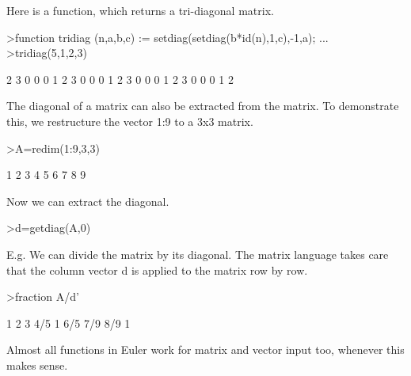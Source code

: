 \documentclass{article}
\begin{document}
\begin{eulernotebook}
\begin{eulercomment}
\begin{eulercomment}
\begin{eulercomment}
\begin{eulercomment}
\begin{eulercomment}
\begin{eulercomment}
\begin{eulercomment}
Here is a function, which returns a tri-diagonal matrix.
\end{eulercomment}
\begin{eulerprompt}
>function tridiag (n,a,b,c) := setdiag(setdiag(b*id(n),1,c),-1,a); ...
>tridiag(5,1,2,3)
\end{eulerprompt}
\begin{euleroutput}
              2             3             0             0             0 
              1             2             3             0             0 
              0             1             2             3             0 
              0             0             1             2             3 
              0             0             0             1             2 
\end{euleroutput}
\begin{eulercomment}
The diagonal of a matrix can also be extracted from the matrix. To
demonstrate this, we restructure the vector 1:9 to a 3x3 matrix.
\end{eulercomment}
\begin{eulerprompt}
>A=redim(1:9,3,3)
\end{eulerprompt}
\begin{euleroutput}
              1             2             3 
              4             5             6 
              7             8             9 
\end{euleroutput}
\begin{eulercomment}
Now we can extract the diagonal.
\end{eulercomment}
\begin{eulerprompt}
>d=getdiag(A,0)
\end{eulerprompt}
\begin{euleroutput}
  [1,  5,  9]
\end{euleroutput}
\begin{eulercomment}
E.g. We can divide the matrix by its diagonal. The matrix language
takes care that the column vector d is applied to the matrix row by
row.
\end{eulercomment}
\begin{eulerprompt}
>fraction A/d'
\end{eulerprompt}
\begin{euleroutput}
          1         2         3 
        4/5         1       6/5 
        7/9       8/9         1 
\end{euleroutput}
\begin{eulercomment}
Almost all functions in Euler work for matrix and vector input too,
whenever this makes sense.


\end{eulercomment}
\end{eulercomment}
\end{eulercomment}
\end{eulercomment}
\end{eulercomment}
\end{eulercomment}
\end{eulercomment}
\end{eulernotebook}
\end{document}
